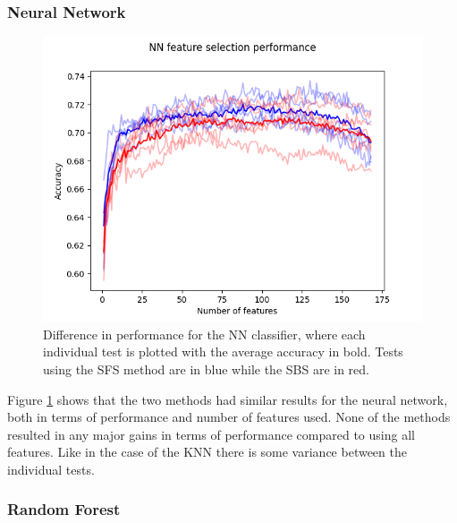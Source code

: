\documentclass{kththesis}
\begin{document}
\subsubsection{Neural Network}

\begin{figure}[h!]
  \begin{center}
    \includegraphics[scale=0.8]{../new_plots/nn_graph.png}
    \caption{Difference in performance for the NN classifier, where each individual test is plotted with the average accuracy in bold. Tests using the SFS method are in blue while the SBS are in red.}
    \label{fig:nn}  %
  \end{center}
\end{figure}

Figure \ref{fig:nn} shows that the two methods had similar results for the neural network, both in terms of performance and number of features used. None of the methods resulted in any major gains in terms of performance compared to using all features. Like in the case of the KNN there is some variance between the individual tests.

\newpage

\subsubsection{Random Forest}
\end{document}
